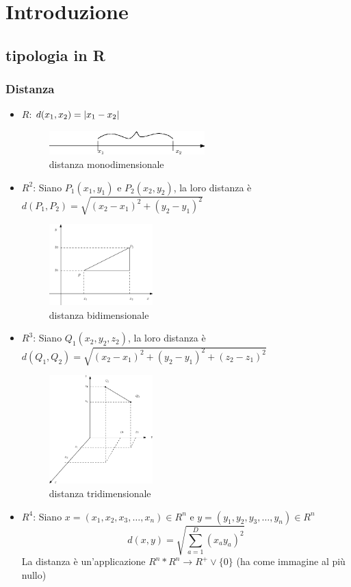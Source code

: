 \chapter{Introduzione}
\section{tipologia in R}
\subsection{Distanza}
\begin{itemize}
\item {\color{red} $R$}: $d(x_1,x_2)=\lvert x_1-x_2\rvert$
	\begin{figure}[ht]
		\centering
		\includegraphics[width=6cm] {img/finiti/r.eps}
		\caption{distanza monodimensionale}
	\end{figure}
\item {\color{red} $R^2$}: Siano $P_1(x_1,y_1)$ e $P_2(x_2,y_2)$, la loro distanza è $d(P_1,P_2)=\sqrt{(x_2-x_1)^2+(y_2-y_1)^2}$
	\begin{figure}[ht]
		\centering
		\includegraphics[width=4cm] {img/finiti/r2.eps}
		\caption{distanza bidimensionale}
	\end{figure}
\item {\color{red} $R^3$}: Siano $Q_1(x_2,y_2,z_2)$, la loro distanza è $d(Q_1,Q_2)=\sqrt{(x_2-x_1)^2+(y_2-y_1)^2+(z_2-z_1)^2}$
	\begin{figure}[ht]
		\centering
		\includegraphics[width=4cm] {img/finiti/r3.eps}
		\caption{distanza tridimensionale}
	\end{figure}
\item {\color{red} $R^4$}: Siano $x=(x_1,x_2,x_3,\dots,x_n)\in R^n$ e $y=(y_1,y_2,y_3,\dots,y_n)\in R^n$
  \begin{equation*}
    d(x,y)=\sqrt{\sum^D_{a=1}(x_ay_a)^2}
  \end{equation*}
  La distanza è un'applicazione $R^n*R^n\to R^+\vee \{0\}$ (ha come immagine al più nullo)
\end{itemize}
